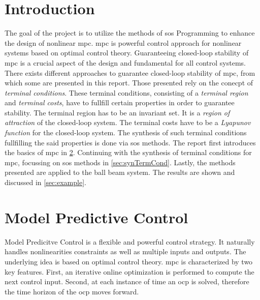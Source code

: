 \documentclass[10pt,a4paper]{article}
\begin{document}
\section{Introduction}
The goal of the project is to utilize the methods of \gls{sos} Programming to enhance the design of nonlinear \gls{mpc}.
\gls{mpc} is powerful control approach for nonlinear systems based on optimal control theory.
Guaranteeing closed-loop stability of \gls{mpc} is a crucial aspect of the design and fundamental for all control systems.
There exists different approaches to guarantee closed-loop stability of \gls{mpc}, from which some are presented in this report.
Those presented rely on the conecpt of \textit{terminal conditions}. These terminal conditions, consisting of a \textit{terminal region} 
and \textit{terminal costs}, have to fullfill certain properties in order to guarantee stability. The terminal region has to be an invariant set.
It is a \textit{region of attraction} of the closed-loop system. The terminal costs have to be a \textit{Lyapunov function} for the closed-loop system.
The synthesis of such terminal conditions fullfilling the said properties is done via \gls{sos} methods. The report first introduces the basics of \gls{mpc} in \ref{sec:mpc}. Continuing with the synthesis of terminal conditions for \gls{mpc},
focussing on \gls{sos} methods in \ref{sec:synTermCond}. Lastly, the methods presented are applied to the 
ball beam system. The results are shown and discussed in \ref{sec:example}.











\section{Model Predictive Control}
\label{sec:mpc}
Model Predicitve Control is a flexible and powerful control strategy. It naturally handles nonlinearities constraints as
well as multiple inputs and outputs. The underlying idea is based on optimal control theory. \gls{mpc} is characterized by
two key features. First, an iterative online optimization is performed to compute the next control input. Second, at each 
instance of time an \gls{ocp} is solved, therefore the time horizon of the \gls{ocp} moves forward. \cite{nmpcBible}
\end{document}
